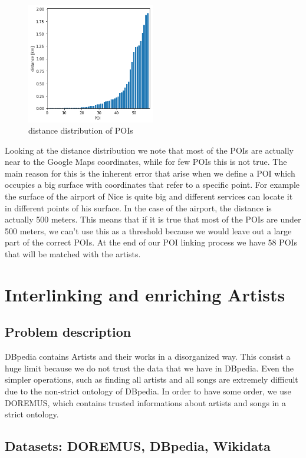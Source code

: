 \documentclass[paper=a4, fontsize=11pt]{scrartcl}
\begin{document}
\begin{figure}[!htb]
  \centering 
    \includegraphics[width=0.5\textwidth]{images/distance.png}
    \caption{distance distribution of POIs}
\end{figure}

Looking at the distance distribution we note that most of the POIs are actually near to the Google Maps coordinates, while for few POIs this is not true. The main reason for this is the inherent error that arise when we define a POI which occupies a big surface with coordinates that refer to a specific point. For example the surface of the airport of Nice is quite big and different services can locate it in different points of his surface. In the case of the airport, the distance is actually 500 meters. This means that if it is true that most of the POIs are under 500 meters, we can't use this as a threshold because we would leave out a large part of the correct POIs.
At the end of our POI linking process we have 58 POIs that will be matched with the artists.

\section{Interlinking and enriching Artists}
\subsection{Problem description}
DBpedia contains Artists and their works in a disorganized way.
This consist a huge limit because we do not trust the data that we have in DBpedia. Even the simpler operations, such as finding all artists and all songs are extremely difficult due to the non-strict ontology of DBpedia. In order to have some order, we use DOREMUS, which contains trusted informations about artists and songs in a strict ontology.

\subsection{Datasets: DOREMUS, DBpedia, Wikidata}
\end{document}
